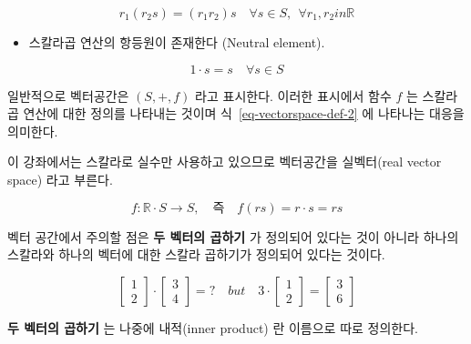 \documentclass[
  11pt,
  a4paper,
  oneside]{scrbook}
\providecommand{\tightlist}{%
  \setlength{\itemsep}{0pt}\setlength{\parskip}{0pt}}\usepackage{longtable,booktabs,array}
\newcommand{\RR}{\mathbb{R}}
\theoremstyle{definition}
\theoremstyle{definition}
\theoremstyle{plain}
\theoremstyle{remark}
\begin{document}
\[  r_1(r_2s) = (r_1 r_2) s  \quad \forall s \in S, ~~ \forall r_1,r_2 in \RR \]

\begin{itemize}
\tightlist
\item
  스칼라곱 연산의 항등원이 존재한다 (Neutral element).
\end{itemize}

\[  1 \cdot s  = s \quad \forall s \in S \]

일반적으로 벡터공간은 \((S,+,f)\) 라고 표시한다. 이러한 표시에서 함수
\(f\) 는 스칼라곱 연산에 대한 정의를 나타내는 것이며
식~\ref{eq-vectorspace-def-2} 에 나타나는 대응을 의미한다.

이 강좌에서는 스칼라로 실수만 사용하고 있으므로 벡터공간을 실벡터(real
vector space) 라고 부른다.

\[ f : \RR \cdot S \rightarrow  S, \quad \text{즉} \quad f(rs) = r \cdot s =rs \]

\begin{tcolorbox}[enhanced jigsaw, colback=white, colframe=quarto-callout-caution-color-frame, opacityback=0, toprule=.15mm, leftrule=.75mm, titlerule=0mm, opacitybacktitle=0.6, title=\textcolor{quarto-callout-caution-color}{\faFire}\hspace{0.5em}{주의}, colbacktitle=quarto-callout-caution-color!10!white, breakable, bottomrule=.15mm, bottomtitle=1mm, toptitle=1mm, arc=.35mm, left=2mm, rightrule=.15mm, coltitle=black]

벡터 공간에서 주의할 점은 \textbf{두 벡터의 곱하기} 가 정의되어 있다는
것이 아니라 하나의 스칼라와 하나의 벡터에 대한 스칼라 곱하기가 정의되어
있다는 것이다.

\[
\begin{bmatrix}
1 \\
2 
\end{bmatrix}
\cdot
\begin{bmatrix}
3 \\
4 
\end{bmatrix}
=?
\quad {but} \quad
3 \cdot
\begin{bmatrix}
1 \\
2 
\end{bmatrix}
= 
\begin{bmatrix}
3 \\
6
\end{bmatrix}
\]

\textbf{두 벡터의 곱하기} 는 나중에 내적(inner product) 란 이름으로 따로
정의한다.

\end{tcolorbox}
\end{document}
